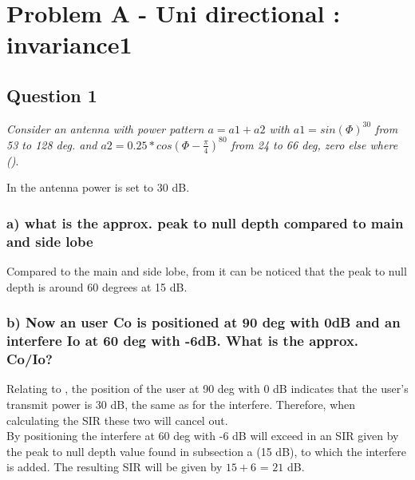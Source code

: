\section{Problem A - Uni directional : invariance1} \label{sec:mm4_PbA}

\subsection{Question 1}
\textit{Consider an antenna with power pattern $a=a1+a2$ with $a1=sin(\Phi)^{30}$ from 53 to 128 deg. and $a2=0.25*cos(\Phi - \frac{\pi}{4})^{80}$ from 24 to 66 deg, zero else where ()}.

In  the antenna power is set to 30 dB.

\subsubsection{a) what is the approx. peak to null depth compared to main and side lobe}

Compared to the main and side lobe, from  it can be noticed that the peak to null depth is around 60 degrees at 15 dB.

\subsubsection{b) Now an user Co is positioned at 90 deg with 0dB and an interfere Io at 60 deg with -6dB. What is the approx. Co/Io?}

Relating to , the position of the user at 90 deg with 0 dB indicates that the user's transmit power is 30 dB, the same as for the interfere. Therefore, when calculating the SIR these two will cancel out.\\

By positioning the interfere at 60 deg with -6 dB will exceed in an SIR given by the peak to null depth value found in subsection a (15 dB), to which the interfere is added. The resulting SIR will be given by $15 + 6$ = $21$ dB.
